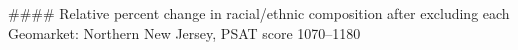 #### Relative percent change in racial/ethnic composition after excluding each Geomarket: Northern New Jersey, PSAT score 1070–1180
